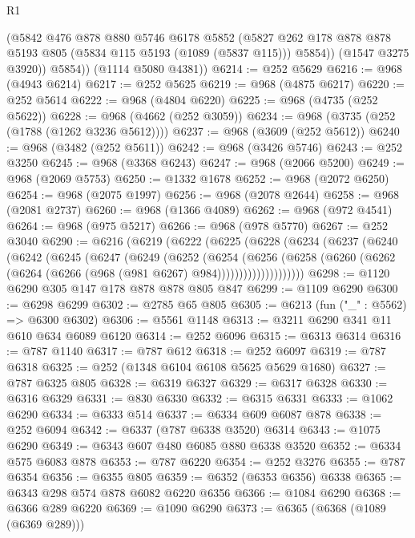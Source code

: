 \begin{lexlean}{R1}
\begin{coremodule}
            (@5842
              @476
              @878
              @880
              @5746
              @6178
              @5852
              (@5827 @262 @178 @878 @878 @5193 @805 (@5834 @115 @5193 (@1089 (@5837 @115))) @5854))
            (@1547 @3275 @3920))
          @5854))
      (@1114 @5080 @4381))
@6214 := @252 @5629
@6216 := @968 (@4943 @6214)
@6217 := @252 @5625
@6219 := @968 (@4875 @6217)
@6220 := @252 @5614
@6222 := @968 (@4804 @6220)
@6225 := @968 (@4735 (@252 @5622))
@6228 := @968 (@4662 (@252 @3059))
@6234 := @968 (@3735 (@252 (@1788 (@1262 @3236 @5612))))
@6237 := @968 (@3609 (@252 @5612))
@6240 := @968 (@3482 (@252 @5611))
@6242 := @968 (@3426 @5746)
@6243 := @252 @3250
@6245 := @968 (@3368 @6243)
@6247 := @968 (@2066 @5200)
@6249 := @968 (@2069 @5753)
@6250 := @1332 @1678
@6252 := @968 (@2072 @6250)
@6254 := @968 (@2075 @1997)
@6256 := @968 (@2078 @2644)
@6258 := @968 (@2081 @2737)
@6260 := @968 (@1366 @4089)
@6262 := @968 (@972 @4541)
@6264 := @968 (@975 @5217)
@6266 := @968 (@978 @5770)
@6267 := @252 @3040
@6290 := @6216
    (@6219
      (@6222
        (@6225
          (@6228
            (@6234
              (@6237
                (@6240
                  (@6242
                    (@6245
                      (@6247
                        (@6249
                          (@6252
                            (@6254
                              (@6256
                                (@6258
                                  (@6260
                                    (@6262 (@6264 (@6266 (@968 (@981 @6267) @984))))))))))))))))))))
@6298 := @1120 @6290 @305 @147 @178 @878 @878 @805 @847
@6299 := @1109 @6290
@6300 := @6298 @6299
@6302 := @2785 @65 @805
@6305 := @6213 (fun ("_" : @5562) => @6300 @6302)
@6306 := @5561 @1148
@6313 := @3211 @6290 @341 @11 @610 @634 @6089 @6120
@6314 := @252 @6096
@6315 := @6313 @6314
@6316 := @787 @1140
@6317 := @787 @612
@6318 := @252 @6097
@6319 := @787 @6318
@6325 := @252 (@1348 @6104 @6108 @5625 @5629 @1680)
@6327 := @787 @6325 @805
@6328 := @6319 @6327
@6329 := @6317 @6328
@6330 := @6316 @6329
@6331 := @830 @6330
@6332 := @6315 @6331
@6333 := @1062 @6290
@6334 := @6333 @514
@6337 := @6334 @609 @6087 @878
@6338 := @252 @6094
@6342 := @6337 (@787 @6338 @3520) @6314
@6343 := @1075 @6290
@6349 := @6343 @607 @480 @6085 @880 @6338 @3520
@6352 := @6334 @575 @6083 @878
@6353 := @787 @6220
@6354 := @252 @3276
@6355 := @787 @6354
@6356 := @6355 @805
@6359 := @6352 (@6353 @6356) @6338
@6365 := @6343 @298 @574 @878 @6082 @6220 @6356
@6366 := @1084 @6290
@6368 := @6366 @289 @6220
@6369 := @1090 @6290
@6373 := @6365 (@6368 (@1089 (@6369 @289)))

\end{coremodule}
\end{lexlean}
